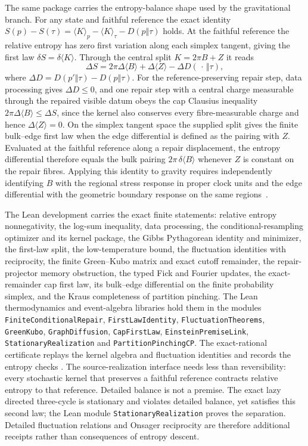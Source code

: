 \documentclass[11pt]{article}
\begin{document}
The same package carries the entropy-balance shape used by the
gravitational branch. For any state and faithful reference the exact
identity
\(S(p)-S(\tau)=\langle K\rangle_p-\langle K\rangle_\tau-D(p\Vert\tau)\)
holds. At the faithful reference the relative entropy has zero
first variation along each simplex tangent, giving the first law
\(\delta S=\delta\langle K\rangle\). Through the central split
\(K=2\pi B+Z\) it reads
\[
\Delta S
=2\pi\Delta\langle B\rangle+\Delta\langle Z\rangle
-\Delta D(\,\cdot\,\Vert\tau),
\]
where \(\Delta D=D(p'\Vert\tau)-D(p\Vert\tau)\). For the
reference-preserving repair step, data processing gives \(\Delta D\le0\), and
one repair step with a central charge measurable through the repaired
visible datum obeys the cap Clausius inequality
\(2\pi\Delta\langle B\rangle\le\Delta S\), since the kernel also conserves
every fibre-measurable charge and hence \(\Delta\langle Z\rangle=0\).
On the simplex tangent space the supplied split gives the finite
bulk--edge first law when the edge differential is defined as the
pairing with \(Z\). Evaluated at the faithful reference along a repair
displacement, the entropy differential therefore equals the bulk pairing
\(2\pi\,\delta\langle B\rangle\) whenever \(Z\) is constant on the
repair fibres. Applying this identity to gravity requires independently
identifying \(B\) with the regional stress response in proper clock units
and the edge differential with the geometric boundary response on the
same regions~\cite{ophEinstein}.

The Lean development carries the exact finite statements: relative
entropy nonnegativity, the log-sum inequality, data processing, the
conditional-resampling optimizer and its kernel package, the Gibbs
Pythagorean identity and minimizer, the first-law split, the
low-temperature bound, the fluctuation identities with reciprocity,
the finite Green--Kubo matrix and exact cutoff remainder, the repair-projector
memory obstruction, the typed Fick and Fourier updates,
the exact-remainder cap first law, its bulk--edge differential on the
finite probability simplex, and the Kraus completeness of
partition pinching. The Lean thermodynamics and event-algebra libraries
hold them in the modules \texttt{FiniteConditionalRepair},
\texttt{FirstLawIdentity}, \texttt{FluctuationTheorems},
\texttt{GreenKubo}, \texttt{GraphDiffusion}, \texttt{CapFirstLaw},
\texttt{EinsteinPremiseLink}, \texttt{StationaryRealization} and
\texttt{PartitionPinchingCP}. The exact-rational certificate replays the kernel algebra and fluctuation identities and
records the entropy checks
\cite{ophrepo}. The source-realization interface needs less than
reversibility: every stochastic kernel that preserves a faithful
reference contracts relative entropy to that reference. Detailed balance is
not a premise. The exact lazy directed three-cycle is stationary and violates
detailed balance, yet satisfies this second law; the Lean module
\texttt{StationaryRealization} proves the separation. Detailed fluctuation
relations and Onsager reciprocity are therefore additional receipts rather
than consequences of entropy descent.
\end{document}
